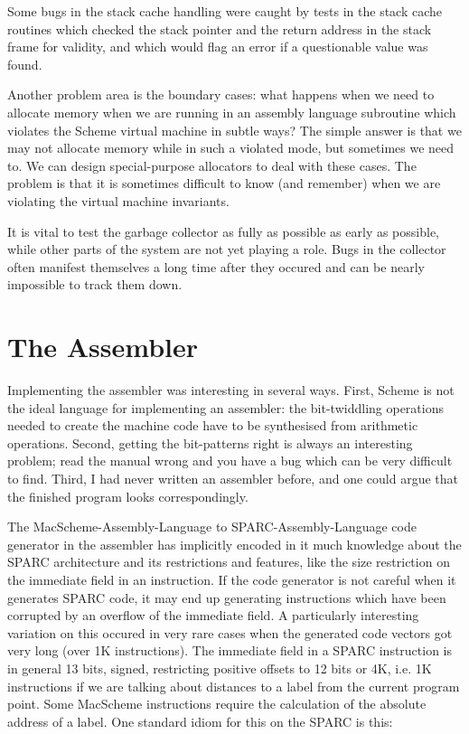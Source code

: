 Some bugs in the stack cache handling were caught by tests in the stack
cache routines which checked the stack pointer and the return address in the
stack frame for validity, and which would flag an error if a questionable
value was found.

Another problem area is the boundary cases: what happens when we need to
allocate memory when we are running in an assembly language subroutine which
violates the Scheme virtual machine in subtle ways? The simple answer is
that we may not allocate memory while in such a violated mode, but sometimes
we need to. We can design special-purpose allocators to deal with these
cases. The problem is that it is sometimes difficult to know (and remember)
when we are violating the virtual machine invariants. 

It is vital to test the garbage collector as fully as possible as early
as possible, while other parts of the system are not yet playing a role.
Bugs in the collector often manifest themselves a long time after they
occured and can be nearly impossible to track them down.


\section{The Assembler}

Implementing the assembler was interesting in several ways. First, Scheme is
not the ideal language for implementing an assembler: the bit-twiddling
operations needed to create the machine code have to be synthesised from
arithmetic operations. Second, getting the bit-patterns right is always
an interesting problem; read the manual wrong and you have a bug which can
be very difficult to find. Third, I had never written an assembler before,
and one could argue that the finished program looks correspondingly.

The MacScheme-Assembly-Language to SPARC-Assembly-Language code generator
in the assembler has implicitly encoded in it much knowledge about the SPARC
architecture and its restrictions and features, like the size restriction on
the immediate field in an instruction. If the code generator is not careful
when it generates SPARC code, it may end up generating instructions which
have been corrupted by an overflow of the immediate field. A particularly
interesting variation on this occured in very rare cases when the generated
code vectors got very long (over 1K instructions). The immediate field in a
SPARC instruction is in general 13 bits, signed, restricting positive offsets
to 12 bits or 4K, i.e.  1K instructions if we are talking about distances to
a label from the current program point. Some MacScheme instructions require
the calculation of the absolute address of a label. One standard idiom for
this on the SPARC is this:

